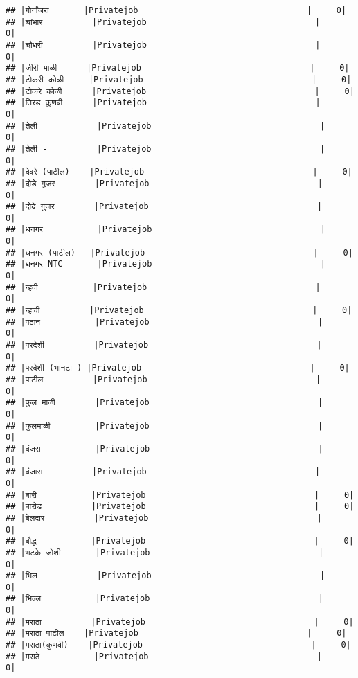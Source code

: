 \documentclass[
]{article}
\begin{document}
\begin{verbatim}
## |गोर्गांजरा       |Privatejob                                  |     0|
## |चांभार          |Privatejob                                  |     0|
## |चौधरी          |Privatejob                                  |     0|
## |जीरी माळी      |Privatejob                                  |     0|
## |टोकरी कोळी     |Privatejob                                  |     0|
## |टोकरे कोळी      |Privatejob                                  |     0|
## |तिरड कुणबी      |Privatejob                                  |     0|
## |तेली            |Privatejob                                  |     0|
## |तेली -          |Privatejob                                  |     0|
## |देवरे (पाटील)    |Privatejob                                  |     0|
## |दोडे गुजर        |Privatejob                                  |     0|
## |दोढे गुजर        |Privatejob                                  |     0|
## |धनगर           |Privatejob                                  |     0|
## |धनगर (पाटील)   |Privatejob                                  |     0|
## |धनगर NTC       |Privatejob                                  |     0|
## |न्हवी           |Privatejob                                  |     0|
## |न्हावी          |Privatejob                                  |     0|
## |पठान           |Privatejob                                  |     0|
## |परदेशी          |Privatejob                                  |     0|
## |परदेशी (भानटा ) |Privatejob                                  |     0|
## |पाटील          |Privatejob                                  |     0|
## |फुल माळी        |Privatejob                                  |     0|
## |फुलमाळी         |Privatejob                                  |     0|
## |बंजरा           |Privatejob                                  |     0|
## |बंजारा          |Privatejob                                  |     0|
## |बारी           |Privatejob                                  |     0|
## |बारोड          |Privatejob                                  |     0|
## |बेलदार          |Privatejob                                  |     0|
## |बौद्ध           |Privatejob                                  |     0|
## |भटके जोशी       |Privatejob                                  |     0|
## |भिल            |Privatejob                                  |     0|
## |भिल्ल           |Privatejob                                  |     0|
## |मराठा          |Privatejob                                  |     0|
## |मराठा पाटील    |Privatejob                                  |     0|
## |मराठा(कुणबी)    |Privatejob                                  |     0|
## |मराठे           |Privatejob                                  |     0|

\end{verbatim}
\end{document}
